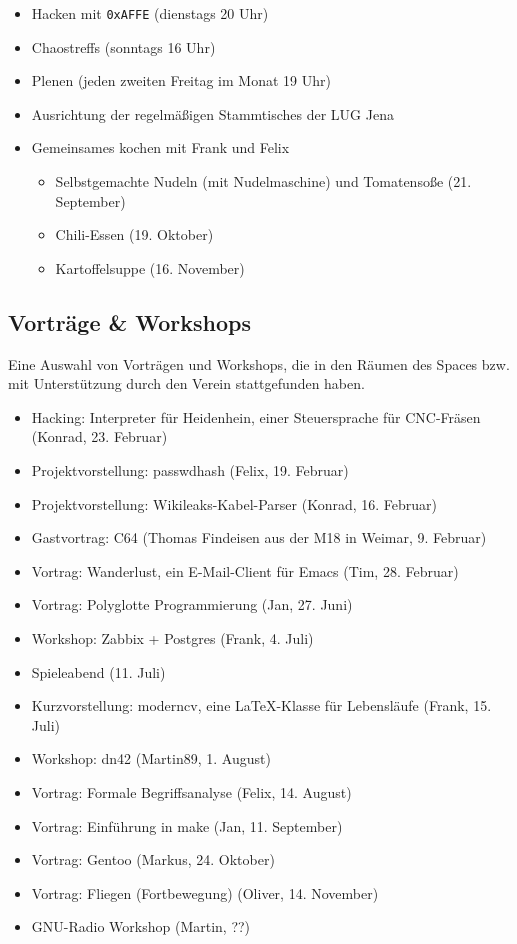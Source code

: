 \documentclass[10pt,DIV16]{scrartcl}
\begin{document}
\begin{itemize}
	\item Hacken mit \texttt{0xAFFE} (dienstags 20 Uhr)
	\item Chaostreffs (sonntags 16 Uhr)
	\item Plenen (jeden zweiten Freitag im Monat 19 Uhr)
	\item Ausrichtung der regelmäßigen Stammtisches der LUG Jena
	\item Gemeinsames kochen mit Frank und Felix
		\begin{itemize}
			\item Selbstgemachte Nudeln (mit Nudelmaschine) und 
				Tomatensoße (21. September)
			\item Chili-Essen (19. Oktober)
			\item Kartoffelsuppe (16. November)
		\end{itemize}
\end{itemize}

\subsection{Vorträge \& Workshops}

Eine Auswahl von Vorträgen und Workshops, die in den Räumen des 
Spaces bzw. mit Unterstützung durch den Verein stattgefunden haben. 

\begin{itemize}
	\item Hacking:  Interpreter für Heidenhein, einer Steuersprache für CNC-Fräsen (Konrad, 23. Februar)
	\item Projektvorstellung:  passwdhash (Felix, 19. Februar)
	\item Projektvorstellung:  Wikileaks-Kabel-Parser (Konrad, 16. Februar)
	\item Gastvortrag:  C64 (Thomas Findeisen aus der M18 in Weimar, 9. Februar)
	\item Vortrag:  Wanderlust, ein E-Mail-Client für Emacs (Tim, 28. Februar)
	\item Vortrag: Polyglotte Programmierung  (Jan, 27. Juni)
	\item Workshop:  Zabbix + Postgres (Frank, 4. Juli)
	\item Spieleabend (11. Juli)
	\item Kurzvorstellung: moderncv, eine \LaTeX-Klasse für Lebensläufe (Frank, 15. Juli)
	\item Workshop:  dn42 (Martin89, 1. August)
	\item Vortrag:  Formale Begriffsanalyse (Felix, 14. August)
	\item Vortrag:  Einführung in make (Jan, 11. September)
	\item Vortrag:  Gentoo (Markus, 24. Oktober)
	\item Vortrag:  Fliegen (Fortbewegung) (Oliver, 14. November)
	\item GNU-Radio Workshop (Martin, ??)
\end{itemize}
\end{document}
